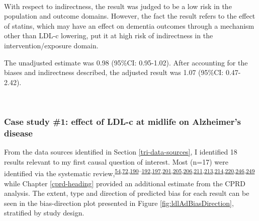 \documentclass[a4paper, twoside]{templates/ociamthesis}
\begin{document}
~

With respect to indirectness, the result was judged to be a low risk in the population and outcome domains. However, the fact the result refers to the effect of statins, which may have an effect on dementia outcomes through a mechanism other than LDL-c lowering, put it at high risk of indirectness in the intervention/exposure domain.

The unadjusted estimate was 0.98 (95\%CI: 0.95-1.02). After accounting for the biases and indirectness described, the adjusted result was 1.07 (95\%CI: 0.47-2.42).

~

\hypertarget{case-study-1-effect-of-ldl-c-at-midlife-on-alzheimers-disease}{%
\subsubsection{Case study \#1: effect of LDL-c at midlife on Alzheimer's disease}\label{case-study-1-effect-of-ldl-c-at-midlife-on-alzheimers-disease}}

From the data sources identified in Section \ref{tri-data-sources}, I identified 18 results relevant to my first causal question of interest. Most (n=17) were identified via the systematic review,\textsuperscript{\protect\hyperlink{ref-schilling2017}{54},\protect\hyperlink{ref-ostergaard2015}{72},\protect\hyperlink{ref-ancelin2012}{190}--\protect\hyperlink{ref-bettermann2012}{192},\protect\hyperlink{ref-chou2014}{197},\protect\hyperlink{ref-haag2009}{201},\protect\hyperlink{ref-li2004}{205},\protect\hyperlink{ref-li2010}{206},\protect\hyperlink{ref-rea2005}{211},\protect\hyperlink{ref-reitz2010}{213},\protect\hyperlink{ref-smeeth2009}{214},\protect\hyperlink{ref-zandi2005}{220},\protect\hyperlink{ref-tynkkynen2018}{246},\protect\hyperlink{ref-yoshitake1995}{249}} while Chapter \ref{cprd-heading} provided an additional estimate from the CPRD analysis. The extent, type and direction of predicted bias for each result can be seen in the bias-direction plot presented in Figure \ref{fig:ldlAdBiasDirection}, stratified by study design.

~
\end{document}
